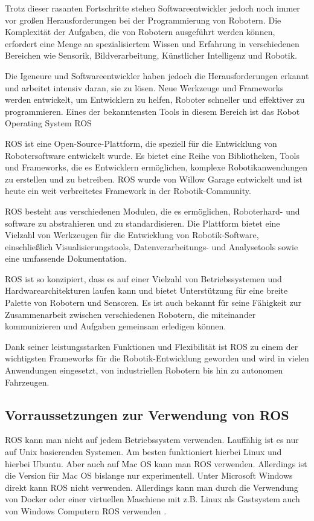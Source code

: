 Trotz dieser rasanten Fortschritte stehen Softwareentwickler jedoch noch immer vor großen Herausforderungen bei der Programmierung von Robotern. Die Komplexität der Aufgaben, die von Robotern ausgeführt werden können, erfordert eine Menge an spezialisiertem Wissen und Erfahrung in verschiedenen Bereichen wie Sensorik, Bildverarbeitung, Künstlicher Intelligenz und Robotik.

Die Igeneure und Softwareentwickler haben jedoch die Herausforderungen erkannt und arbeitet intensiv daran, sie zu lösen. Neue Werkzeuge und Frameworks werden entwickelt, um Entwicklern zu helfen, Roboter schneller und effektiver zu programmieren. Eines der bekanntensten Tools in diesem Bereich ist das Robot Operating System \ac{ROS}

\ac{ROS} ist eine Open-Source-Plattform, die speziell für die Entwicklung von Robotersoftware entwickelt wurde. Es bietet eine Reihe von Bibliotheken, Tools und Frameworks, die es Entwicklern ermöglichen, komplexe Robotikanwendungen zu erstellen und zu betreiben. \ac{ROS} wurde von Willow Garage entwickelt und ist heute ein weit verbreitetes Framework in der Robotik-Community.

\ac{ROS} besteht aus verschiedenen Modulen, die es ermöglichen, Roboterhard-  und software zu abstrahieren und zu standardisieren. Die Plattform bietet eine Vielzahl von Werkzeugen für die Entwicklung von Robotik-Software, einschließlich Visualisierungstools, Datenverarbeitungs- und Analysetools sowie eine umfassende Dokumentation.

\ac{ROS} ist so konzipiert, dass es auf einer Vielzahl von Betriebssystemen und Hardwarearchitekturen laufen kann und bietet Unterstützung für eine breite Palette von Robotern und Sensoren. Es ist auch bekannt für seine Fähigkeit zur Zusammenarbeit zwischen verschiedenen Robotern, die miteinander kommunizieren und Aufgaben gemeinsam erledigen können.

Dank seiner leistungsstarken Funktionen und Flexibilität ist \ac{ROS} zu einem der wichtigsten Frameworks für die Robotik-Entwicklung geworden und wird in vielen Anwendungen eingesetzt, von industriellen Robotern bis hin zu autonomen Fahrzeugen.

    \subsection{Vorraussetzungen zur Verwendung von ROS} \label{Vorraussetzungen zur Verwendung von ROS:subsection}
    \ac{ROS} kann man nicht auf jedem Betriebssystem verwenden. Lauffähig ist es nur auf Unix basierenden Systemen. Am besten funktioniert hierbei Linux und hierbei Ubuntu. Aber auch auf Mac OS kann man ROS verwenden. Allerdings ist die Version für Mac OS bislange nur experimentell. Unter Microsoft Windows direkt kann \ac{ROS} nicht verwenden. Allerdings kann man durch die Verwendung von Docker oder einer virtuellen Maschiene mit z.B. Linux als Gastsystem auch von Windows Computern \ac{ROS} verwenden \cite[vgl.][]{ROSIntroduction}.

